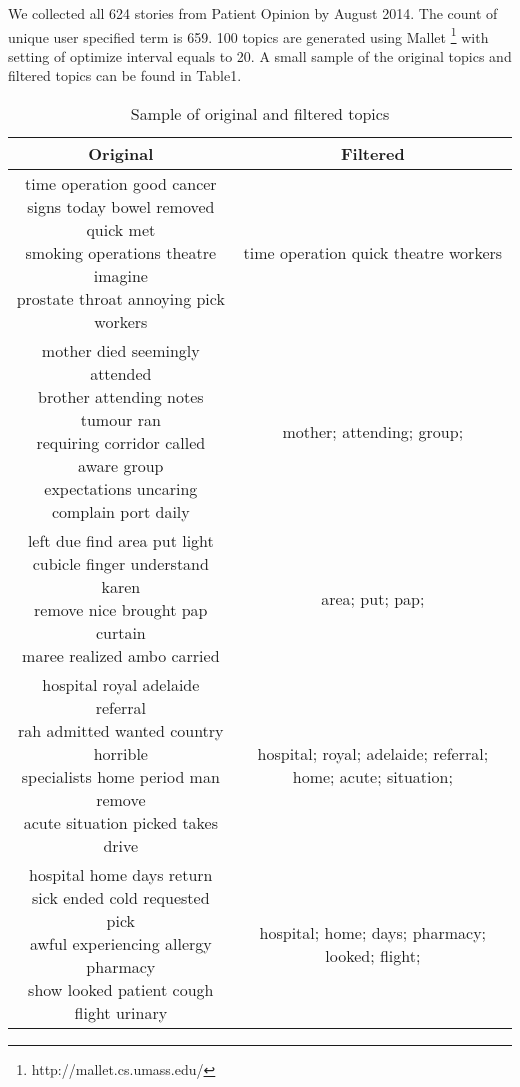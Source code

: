 \documentclass[11pt,twoside]{report}
\begin{document}
We collected all 624 stories from Patient Opinion by August 2014. The count of unique user specified term is 659. 100 topics are generated using Mallet \footnote{http://mallet.cs.umass.edu/} with setting of optimize interval equals to 20. A small sample of the original topics and filtered topics  can be found in Table1. 
\begin{table}[ht]
\caption{Sample of original and filtered topics}
\centering
\begin{tabular}{|c|c|}
\hline\hline
Original & Filtered\\
\hline
\makecell{time operation good cancer \\
signs today bowel removed quick met\\
smoking operations theatre imagine \\
prostate throat annoying pick workers} & time operation quick theatre workers \\
\hline

\makecell{mother died seemingly attended\\
 brother attending notes tumour ran\\ 
 requiring corridor called aware group \\
expectations uncaring complain port daily} & mother; attending; group;\\
\hline

\makecell{left due find area put light\\
 cubicle finger understand karen \\
 remove nice brought pap curtain\\
  maree realized ambo carried} & area; put; pap;\\
\hline

\makecell{hospital royal adelaide referral \\
rah admitted wanted country horrible\\
 specialists home period man remove\\
  acute situation picked takes drive} & hospital; royal; adelaide; referral; home; acute; situation;\\
\hline
  
\makecell{hospital home days return \\
sick ended cold requested pick\\
 awful experiencing allergy pharmacy\\
 show looked patient cough flight urinary} & hospital; home; days; pharmacy; looked; flight;\\

\hline
\end{tabular}
\label{table:Sample of original and filtered topics}
\end{table}
\end{document}
